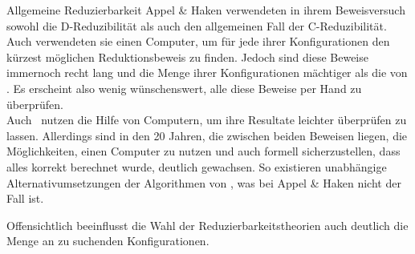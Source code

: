 \begin{section}{Allgemeine Reduzierbarkeit}
 Appel \& Haken verwendeten in ihrem Beweisversuch sowohl die D-Reduzibilität als auch den allgemeinen Fall der C-Reduzibilität. Auch verwendeten sie einen Computer, um für jede ihrer Konfigurationen den kürzest möglichen Reduktionsbeweis zu finden. Jedoch sind diese Beweise immernoch recht lang und die Menge ihrer Konfigurationen mächtiger als die von \rsst. Es erscheint also wenig wünschenswert, alle diese Beweise per Hand zu überprüfen. \\
 Auch \rsst\-\ nutzen die Hilfe von Computern, um ihre Resultate leichter überprüfen zu lassen. Allerdings sind in den 20 Jahren, die zwischen beiden Beweisen liegen, die Möglichkeiten, einen Computer zu nutzen und auch formell sicherzustellen, dass alles korrekt berechnet wurde, deutlich gewachsen. So existieren unabhängige Alternativumsetzungen der Algorithmen von \rsst, was bei Appel \& Haken nicht der Fall ist. 
 
 Offensichtlich beeinflusst die Wahl der Reduzierbarkeitstheorien auch deutlich die Menge an zu suchenden Konfigurationen.
\end{section}
